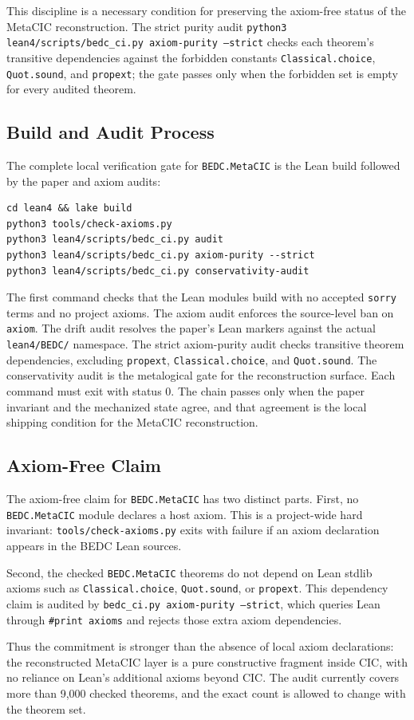 This discipline is a necessary condition for preserving the axiom-free status
of the MetaCIC reconstruction. The strict purity audit
\texttt{python3 lean4/scripts/bedc\_ci.py axiom-purity --strict} checks each
theorem's transitive dependencies against the forbidden constants
\texttt{Classical.choice}, \texttt{Quot.sound}, and \texttt{propext}; the gate
passes only when the forbidden set is empty for every audited theorem.

\subsection{Build and Audit Process}\label{subsec:reconstruction-build-audit-process}

The complete local verification gate for \texttt{BEDC.MetaCIC} is the Lean
build followed by the paper and axiom audits:

\begin{verbatim}
cd lean4 && lake build
python3 tools/check-axioms.py
python3 lean4/scripts/bedc_ci.py audit
python3 lean4/scripts/bedc_ci.py axiom-purity --strict
python3 lean4/scripts/bedc_ci.py conservativity-audit
\end{verbatim}

The first command checks that the Lean modules build with no accepted
\texttt{sorry} terms and no project axioms. The axiom audit enforces the
source-level ban on \texttt{axiom}. The drift audit resolves the paper's Lean
markers against the actual \texttt{lean4/BEDC/} namespace. The strict
axiom-purity audit checks transitive theorem dependencies, excluding
\texttt{propext}, \texttt{Classical.choice}, and \texttt{Quot.sound}. The
conservativity audit is the metalogical gate for the reconstruction surface.
Each command must exit with status $0$. The chain passes only when the paper
invariant and the mechanized state agree, and that agreement is the local
shipping condition for the MetaCIC reconstruction.

\subsection{Axiom-Free Claim}\label{subsec:reconstruction-axiom-free-claim}

The axiom-free claim for \texttt{BEDC.MetaCIC} has two distinct parts. First,
no \texttt{BEDC.MetaCIC} module declares a host axiom. This is a project-wide
hard invariant: \texttt{tools/check-axioms.py} exits with failure if an axiom
declaration appears in the BEDC Lean sources.

Second, the checked \texttt{BEDC.MetaCIC} theorems do not depend on Lean
stdlib axioms such as \texttt{Classical.choice}, \texttt{Quot.sound}, or
\texttt{propext}. This dependency claim is audited by
\texttt{bedc\_ci.py axiom-purity --strict}, which queries Lean through
\texttt{\#print axioms} and rejects those extra axiom dependencies.

Thus the commitment is stronger than the absence of local axiom declarations:
the reconstructed MetaCIC layer is a pure constructive fragment inside CIC,
with no reliance on Lean's additional axioms beyond CIC. The audit currently
covers more than 9,000 checked theorems, and the exact count is allowed to
change with the theorem set.
